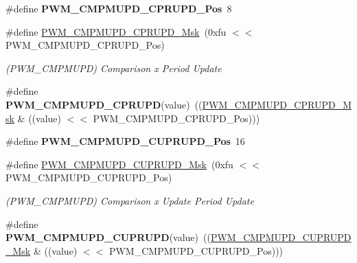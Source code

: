 \begin{DoxyCompactItemize}
\#define {\bfseries P\+W\+M\+\_\+\+C\+M\+P\+M\+U\+P\+D\+\_\+\+C\+P\+R\+U\+P\+D\+\_\+\+Pos}~8
\item 
\mbox{\label{group__SAMS70__PWM_ga9a42f6b4ac753fe27df637c3cfba9ec7}} 
\#define \mbox{\hyperlink{group__SAMS70__PWM_ga9a42f6b4ac753fe27df637c3cfba9ec7}{P\+W\+M\+\_\+\+C\+M\+P\+M\+U\+P\+D\+\_\+\+C\+P\+R\+U\+P\+D\+\_\+\+Msk}}~(0xfu $<$$<$ P\+W\+M\+\_\+\+C\+M\+P\+M\+U\+P\+D\+\_\+\+C\+P\+R\+U\+P\+D\+\_\+\+Pos)
\begin{DoxyCompactList}\small\item\em (P\+W\+M\+\_\+\+C\+M\+P\+M\+U\+PD) Comparison x Period Update \end{DoxyCompactList}\item 
\mbox{\label{group__SAMS70__PWM_ga55aea1151db2640b6a1fafb9a7cc023e}} 
\#define {\bfseries P\+W\+M\+\_\+\+C\+M\+P\+M\+U\+P\+D\+\_\+\+C\+P\+R\+U\+PD}(value)~((\mbox{\hyperlink{group__SAMV71__PWM_ga9a42f6b4ac753fe27df637c3cfba9ec7}{P\+W\+M\+\_\+\+C\+M\+P\+M\+U\+P\+D\+\_\+\+C\+P\+R\+U\+P\+D\+\_\+\+Msk}} \& ((value) $<$$<$ P\+W\+M\+\_\+\+C\+M\+P\+M\+U\+P\+D\+\_\+\+C\+P\+R\+U\+P\+D\+\_\+\+Pos)))
\item 
\mbox{\label{group__SAMS70__PWM_ga215cfa6f967c8c69cb03500156c783e3}} 
\#define {\bfseries P\+W\+M\+\_\+\+C\+M\+P\+M\+U\+P\+D\+\_\+\+C\+U\+P\+R\+U\+P\+D\+\_\+\+Pos}~16
\item 
\mbox{\label{group__SAMS70__PWM_ga54677fe388d0a3e54a38a078f36137bf}} 
\#define \mbox{\hyperlink{group__SAMS70__PWM_ga54677fe388d0a3e54a38a078f36137bf}{P\+W\+M\+\_\+\+C\+M\+P\+M\+U\+P\+D\+\_\+\+C\+U\+P\+R\+U\+P\+D\+\_\+\+Msk}}~(0xfu $<$$<$ P\+W\+M\+\_\+\+C\+M\+P\+M\+U\+P\+D\+\_\+\+C\+U\+P\+R\+U\+P\+D\+\_\+\+Pos)
\begin{DoxyCompactList}\small\item\em (P\+W\+M\+\_\+\+C\+M\+P\+M\+U\+PD) Comparison x Update Period Update \end{DoxyCompactList}\item 
\mbox{\label{group__SAMS70__PWM_ga62488dad3ad02edd4b9f10186f329f91}} 
\#define {\bfseries P\+W\+M\+\_\+\+C\+M\+P\+M\+U\+P\+D\+\_\+\+C\+U\+P\+R\+U\+PD}(value)~((\mbox{\hyperlink{group__SAMV71__PWM_ga54677fe388d0a3e54a38a078f36137bf}{P\+W\+M\+\_\+\+C\+M\+P\+M\+U\+P\+D\+\_\+\+C\+U\+P\+R\+U\+P\+D\+\_\+\+Msk}} \& ((value) $<$$<$ P\+W\+M\+\_\+\+C\+M\+P\+M\+U\+P\+D\+\_\+\+C\+U\+P\+R\+U\+P\+D\+\_\+\+Pos)))

\end{DoxyCompactItemize}
